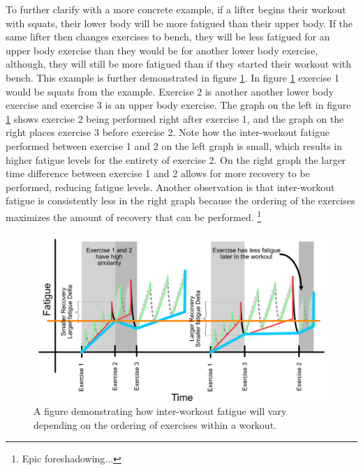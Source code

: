 To further clarify with a more concrete example, if a lifter begins their workout with squats, their lower body will be more fatigued than their upper body. If the same lifter then changes exercises to bench, they will be less fatigued for an upper body exercise than they would be for another lower body exercise, although, they will still be more fatigued than if they started their workout with bench. This example is further demonstrated in figure \ref{fig:P2C1_InterWorkoutExerciseOrder}. In figure \ref{fig:P2C1_InterWorkoutExerciseOrder} exercise 1 would be squats from the example. Exercise 2 is another another lower body exercise and exercise 3 is an upper body exercise. The graph on the left in figure \ref{fig:P2C1_InterWorkoutExerciseOrder} shows exercise 2 being performed right after exercise 1, and the graph on the right places exercise 3 before exercise 2. Note how the inter-workout fatigue performed between exercise 1 and 2 on the left graph is small, which results in higher fatigue levels for the entirety of exercise 2. On the right graph the larger time difference between exercise 1 and 2 allows for more recovery to be performed, reducing fatigue levels. Another observation is that inter-workout fatigue is consistently less in the right graph because the ordering of the exercises maximizes the amount of recovery that can be performed. \footnote{Epic foreshadowing...}

\begin{figure}[htb]
    \centering
    \includegraphics[scale=0.55]{images/ch2/InterWorkoutExerciseOrder.png}
    \caption{A figure demonstrating how inter-workout fatigue will vary depending on the ordering of exercises within a workout.}
    \label{fig:P2C1_InterWorkoutExerciseOrder}
\end{figure}



